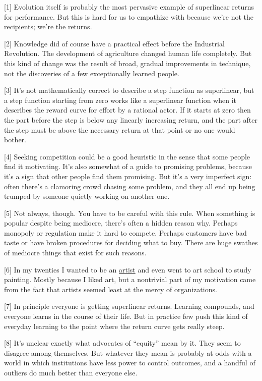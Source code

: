 {[}1{]} Evolution itself is probably the most pervasive example of
superlinear returns for performance. But this is hard for us to
empathize with because we're not the recipients; we're the returns.

{[}2{]} Knowledge did of course have a practical effect before the
Industrial Revolution. The development of agriculture changed human life
completely. But this kind of change was the result of broad, gradual
improvements in technique, not the discoveries of a few exceptionally
learned people.

{[}3{]} It's not mathematically correct to describe a step function as
superlinear, but a step function starting from zero works like a
superlinear function when it describes the reward curve for effort by a
rational actor. If it starts at zero then the part before the step is
below any linearly increasing return, and the part after the step must
be above the necessary return at that point or no one would bother.

{[}4{]} Seeking competition could be a good heuristic in the sense that
some people find it motivating. It's also somewhat of a guide to
promising problems, because it's a sign that other people find them
promising. But it's a very imperfect sign: often there's a clamoring
crowd chasing some problem, and they all end up being trumped by someone
quietly working on another one.

{[}5{]} Not always, though. You have to be careful with this rule. When
something is popular despite being mediocre, there's often a hidden
reason why. Perhaps monopoly or regulation make it hard to compete.
Perhaps customers have bad taste or have broken procedures for deciding
what to buy. There are huge swathes of mediocre things that exist for
such reasons.

{[}6{]} In my twenties I wanted to be an \href{worked.html}{artist} and
even went to art school to study painting. Mostly because I liked art,
but a nontrivial part of my motivation came from the fact that artists
seemed least at the mercy of organizations.

{[}7{]} In principle everyone is getting superlinear returns. Learning
compounds, and everyone learns in the course of their life. But in
practice few push this kind of everyday learning to the point where the
return curve gets really steep.

{[}8{]} It's unclear exactly what advocates of ``equity'' mean by it.
They seem to disagree among themselves. But whatever they mean is
probably at odds with a world in which institutions have less power to
control outcomes, and a handful of outliers do much better than everyone
else.

